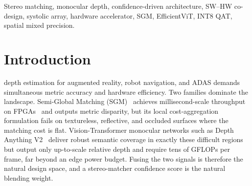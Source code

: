 \documentclass[journal]{IEEEtran}
\begin{document}
\begin{abstract}
precision at matched bit-budget; both are flagged as future work in Sec.~\ref{sec:future}. Performance numbers come from a two-tier model (Sec.~\ref{sec:method_perfmodel}): per-engine event-driven cycle modeling combined with a frame-level critical-path scheduler. At 28\,nm and 500\,MHz, the design completes one EffViT-B1-h24 INT8 frame at 384$\times$768 in $\sim$25\,ms (40\,FPS) within 1.87\,mm$^2$ / 172\,mW core, and reduces KITTI D1 from 15.08\% (in-house-protocol heuristic baseline) to 6.08\% (b1\_h24 W8A8 on the expanded training pool of Sec.~\ref{sec:training_protocol}). We caveat that the four-dataset numbers in this paper use in-house evaluation splits; cross-protocol comparison with published stereo numbers is treated only as background positioning, not as a primary claim (Sec.~\ref{sec:sota}).
\end{abstract}

\begin{IEEEkeywords}
Stereo matching, monocular depth, confidence-driven architecture, SW--HW co-design, systolic array, hardware accelerator, SGM, EfficientViT, INT8 QAT, spatial mixed precision.
\end{IEEEkeywords}

\section{Introduction}
 depth estimation for augmented reality, robot navigation, and ADAS demands simultaneous metric accuracy and hardware efficiency. Two families dominate the landscape. Semi-Global Matching (SGM)~\cite{hirschmuller2008sgm} achieves millisecond-scale throughput on FPGAs~\cite{zhao2020fpstereo} and outputs metric disparity, but its local cost-aggregation formulation fails on textureless, reflective, and occluded surfaces where the matching cost is flat. Vision-Transformer monocular networks such as Depth Anything V2~\cite{yang2024da2} deliver robust semantic coverage in exactly these difficult regions but output only up-to-scale relative depth and require tens of GFLOPs per frame, far beyond an edge power budget. Fusing the two signals is therefore the natural design space, and a stereo-matcher confidence score is the natural blending weight.
\end{document}
